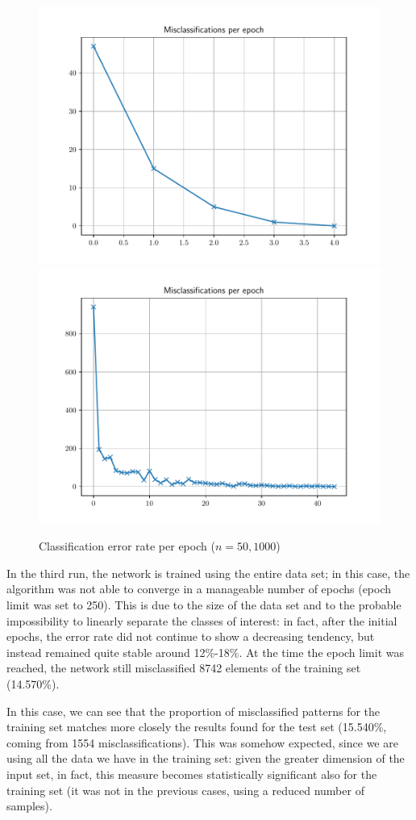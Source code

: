 \documentclass[letterpaper,headings=standardclasses]{scrartcl}
\begin{document}
\begin{figure}[h]
\centering
\includegraphics[width=.49\linewidth]{errors_50.pdf}
\includegraphics[width=.49\linewidth]{errors_1000.pdf}
\caption{Classification error rate per epoch ($n = 50, 1000$)}
\label{errors_50_1000}
\end{figure}

In the third run, the network is trained using the entire data set; in this case, the algorithm was not able to converge in a manageable number of epochs (epoch limit was set to 250). This is due to the size of the data set and to the probable impossibility to linearly separate the classes of interest: in fact, after the initial epochs, the error rate did not continue to show a decreasing tendency, but instead remained quite stable around 12\%-18\%. At the time the epoch limit was reached, the network still misclassified 8742 elements of the training set (14.570\%). 

In this case, we can see that the proportion of misclassified patterns for the training set matches more closely the results found for the test set (15.540\%, coming from 1554 misclassifications). This was somehow expected, since we are using all the data we have in the training set: given the greater dimension of the input set, in fact, this measure becomes statistically significant also for the training set (it was not in the previous cases, using a reduced number of samples).
\end{document}
